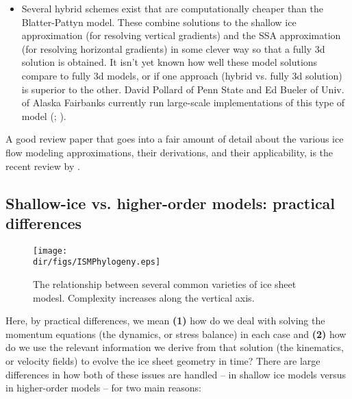 \begin{itemize}
\item Several hybrid schemes exist that are computationally cheaper than the Blatter-Pattyn model. These combine solutions to the shallow ice approximation (for resolving vertical gradients) and the SSA approximation (for resolving horizontal gradients) in some clever way so that a fully 3d solution is obtained. It isn't yet known how well these model solutions compare to fully 3d models, or if one approach (hybrid vs. fully 3d solution) is superior to the other. David Pollard of Penn State and Ed Bueler of Univ. of Alaska Fairbanks currently run large-scale implementations of this type of model (\citet{Bueler:2009ee}; \citet{Pollard:2009ed}).
\end{itemize}

A good review paper that goes into a fair amount of detail about the various ice flow modeling approximations, their derivations, and their applicability, is the recent review by \citet{Schoof:2013is}.

\subsection{Shallow-ice vs. higher-order models: practical differences}

\begin{figure}
  \begin{center}
    \texttt{[image: \\dir/figs/ISMPhylogeny.eps]}
   \end{center}
  \caption{The relationship between several common varieties of ice sheet modesl. Complexity increases along the vertical axis.}
   \label{fig:phylogeny}
\end{figure} 

Here, by practical differences, we mean \textbf{(1)} how do we deal with solving the momentum equations (the dynamics, or stress balance) in each case and \textbf{(2)} how do we use the relevant information we derive from that solution (the kinematics, or velocity fields) to evolve the ice sheet geometry in time? There are large differences in how both of these issues are handled -- in shallow ice models versus in higher-order models -- for two main reasons:

